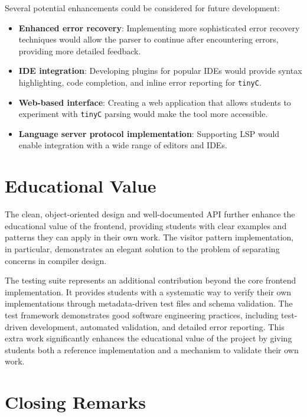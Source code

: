 Several potential enhancements could be considered for future development:

\begin{itemize}
    \item \textbf{Enhanced error recovery}: Implementing more sophisticated error recovery techniques would allow the parser to continue after encountering errors, providing more detailed feedback.
    
    \item \textbf{IDE integration}: Developing plugins for popular IDEs would provide syntax highlighting, code completion, and inline error reporting for \texttt{tinyC}.
    
    \item \textbf{Web-based interface}: Creating a web application that allows students to experiment with \texttt{tinyC} parsing would make the tool more accessible.
    
    \item \textbf{Language server protocol implementation}: Supporting LSP would enable integration with a wide range of editors and IDEs.
\end{itemize}

\section{Educational Value}

The clean, object-oriented design and well-documented API further enhance the educational value of the frontend, providing students with clear examples and patterns they can apply in their own work. The visitor pattern implementation, in particular, demonstrates an elegant solution to the problem of separating concerns in compiler design.

The testing suite represents an additional contribution beyond the core frontend implementation. It provides students with a systematic way to verify their own implementations through metadata-driven test files and schema validation. The test framework demonstrates good software engineering practices, including test-driven development, automated validation, and detailed error reporting. This extra work significantly enhances the educational value of the project by giving students both a reference implementation and a mechanism to validate their own work.

\section{Closing Remarks}


